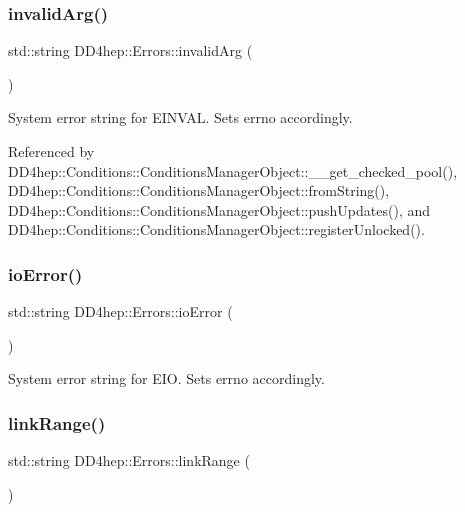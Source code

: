 \hypertarget{namespace_d_d4hep_1_1_errors_ab559bb58296daa1eed2725c602cb2483}{}\label{namespace_d_d4hep_1_1_errors_ab559bb58296daa1eed2725c602cb2483} 
\subsubsection{\texorpdfstring{invalid\+Arg()}{invalidArg()}}
{\footnotesize\ttfamily std\+::string D\+D4hep\+::\+Errors\+::invalid\+Arg (\begin{DoxyParamCaption}{ }\end{DoxyParamCaption})}



System error string for E\+I\+N\+V\+AL. Sets errno accordingly. 



Referenced by D\+D4hep\+::\+Conditions\+::\+Conditions\+Manager\+Object\+::\+\_\+\+\_\+get\+\_\+checked\+\_\+pool(), D\+D4hep\+::\+Conditions\+::\+Conditions\+Manager\+Object\+::from\+String(), D\+D4hep\+::\+Conditions\+::\+Conditions\+Manager\+Object\+::push\+Updates(), and D\+D4hep\+::\+Conditions\+::\+Conditions\+Manager\+Object\+::register\+Unlocked().

\hypertarget{namespace_d_d4hep_1_1_errors_af232117521264a5f6e1211c887e265fd}{}\label{namespace_d_d4hep_1_1_errors_af232117521264a5f6e1211c887e265fd} 
\subsubsection{\texorpdfstring{io\+Error()}{ioError()}}
{\footnotesize\ttfamily std\+::string D\+D4hep\+::\+Errors\+::io\+Error (\begin{DoxyParamCaption}{ }\end{DoxyParamCaption})}



System error string for E\+IO. Sets errno accordingly. 

\hypertarget{namespace_d_d4hep_1_1_errors_a6e59237308b289629424651a17eb8163}{}\label{namespace_d_d4hep_1_1_errors_a6e59237308b289629424651a17eb8163} 
\subsubsection{\texorpdfstring{link\+Range()}{linkRange()}}
{\footnotesize\ttfamily std\+::string D\+D4hep\+::\+Errors\+::link\+Range (\begin{DoxyParamCaption}{ }\end{DoxyParamCaption})}



